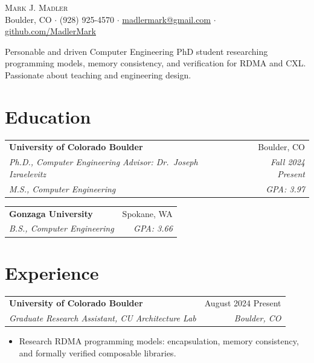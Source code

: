 \documentclass[letterpaper,10pt]{article}
\newcommand{\entry}[4]{%
  \begin{tabularx}{\textwidth}{X r}
    \textbf{#1} & #2 \\
    \textit{#3} & \textit{#4} \\
  \end{tabularx}\par\vspace{1pt}%
}
\begin{document}
\begin{center}
  {\Huge\scshape Mark J. Madler} \\[3pt]
  Boulder, CO \;$\cdot$\;
  (928) 925-4570 \;$\cdot$\;
  \href{mailto:madlermark@gmail.com}{madlermark@gmail.com} \;$\cdot$\;
  \href{https://github.com/MadlerMark}{github.com/MadlerMark}
\end{center}
\vspace{-2pt}

Personable and driven Computer Engineering PhD student researching programming
models, memory consistency, and verification for RDMA and CXL. Passionate about
teaching and engineering design.

\section{Education}

\begin{tabularx}{\textwidth}{X r}
  \textbf{University of Colorado Boulder} & Boulder, CO \\
  \textit{Ph.D., Computer Engineering \textendash{} Advisor: Dr.\ Joseph Izraelevitz}
    & \textit{Fall 2024 \textendash{} Present} \\
  \textit{M.S., Computer Engineering} & \textit{GPA: 3.97} \\
\end{tabularx}\par\vspace{1pt}

\entry{Gonzaga University}{Spokane, WA}
      {B.S., Computer Engineering}{GPA: 3.66}

\section{Experience}

\entry{University of Colorado Boulder}{August 2024 \textendash{} Present}
      {Graduate Research Assistant, CU Architecture Lab}{Boulder, CO}
\begin{itemize}
  \item Research RDMA programming models: encapsulation, memory consistency,
        and formally verified composable libraries.
\end{itemize}
\end{document}
